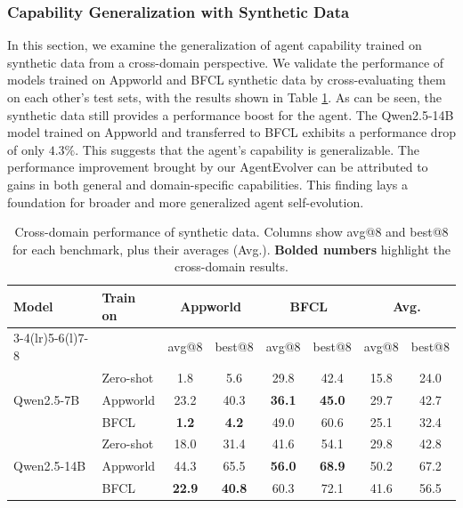 \subsubsection{Capability Generalization with Synthetic Data}

In this section, we examine the generalization of agent capability trained on synthetic data from a cross-domain perspective. We validate the performance of models trained on Appworld and BFCL synthetic data by cross-evaluating them on each other's test sets, with the results shown in Table \ref{tab:cross-domain-performance-synthetic-data}.
As can be seen, the synthetic data still provides a performance boost for the agent. The Qwen2.5-14B model trained on Appworld and transferred to BFCL exhibits a performance drop of only $4.3\%$. This suggests that the agent's capability is generalizable. The performance improvement brought by our AgentEvolver can be attributed to gains in both general and domain-specific capabilities.
This finding lays a foundation for broader and more generalized agent self-evolution.

\begin{table}[htbp]
    \centering
    \caption{Cross-domain performance of synthetic data. Columns show avg@8 and best@8 for each benchmark, plus their averages (Avg.). \textbf{Bolded numbers} highlight the cross-domain results.}
    \label{tab:cross-domain-performance-synthetic-data}
    \small
    \begin{tabular}{llcccc|cc}
    \toprule
         \textbf{Model} & \textbf{Train on} & \multicolumn{2}{c}{\textbf{Appworld}} & \multicolumn{2}{c}{\textbf{BFCL}} & \multicolumn{2}{|c}{\textbf{Avg.}} \\ 
         \cmidrule(lr){3-4}\cmidrule(lr){5-6}\cmidrule(l){7-8}
         &  & avg@8 & best@8 & avg@8 & best@8 & avg@8 & best@8  \\ 
    \midrule
        \multirow{3}{*}{Qwen2.5-7B} & Zero-shot & 1.8 & 5.6 & 29.8  & 42.4 & 15.8 & 24.0 \\ 
        \cmidrule(lr){2-8}
         & Appworld  & 23.2 & 40.3 & \textbf{36.1} & \textbf{45.0} & 29.7 & 42.7 \\ 
         & BFCL & \textbf{1.2} & \textbf{4.2} & 49.0 & 60.6 & 25.1 & 32.4 \\ 
    \midrule
        \multirow{3}{*}{Qwen2.5-14B} & Zero-shot & 18.0  & 31.4  & 41.6 & 54.1 & 29.8 & 42.8 \\ 
        \cmidrule(lr){2-8}
         & Appworld  & 44.3  & 65.5  & \textbf{56.0} & \textbf{68.9} & 50.2 & 67.2 \\ 
         & BFCL & \textbf{22.9}  & \textbf{40.8}  & 60.3 & 72.1 &  41.6 & 56.5  \\ 
    \bottomrule
    \end{tabular}
\end{table}

